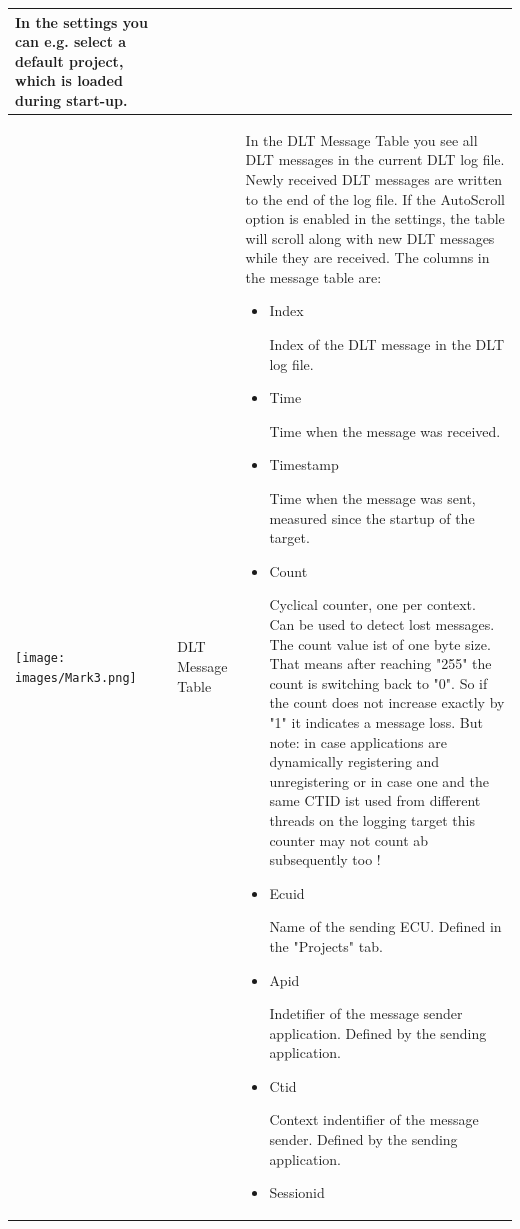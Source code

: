\documentclass[a4paper,11pt]{article}
\begin{document}
\begin{longtable}{| l | m{3cm}  | m{11cm} |}
   In the settings you can e.g. select a default project, which is loaded during start-up.  \\
   \hline
   \texttt{[image: images/Mark3.png]}
   &
    DLT Message Table
   &
   In the DLT Message Table you see all DLT messages in the current DLT log file.
   Newly received DLT messages are written to the end of the log file.
   If the AutoScroll option is enabled in the settings, the table will scroll along with new DLT messages while they are received.
   The columns in the message table are:\label{messagetablecolumns}
  \begin{itemize}
   \item \begin{bf}Index\end{bf}
    Index of the DLT message in the DLT log file.
   \item \begin{bf}Time\end{bf}
    Time when the message was received.
   \item \begin{bf}Timestamp\end{bf}
     Time when the message was sent, measured since the startup of the target.
   \item \begin{bf}Count\end{bf}
    Cyclical counter, one per context. Can be used to detect lost messages. The count value ist of one byte size. That means after 
    reaching "255" the count is switching back to "0". So if the count does not increase exactly by "1" it indicates a message loss.
    But note: in case applications are dynamically registering and unregistering or in case one and the same CTID ist used from
    different threads on the logging target this counter may not count ab subsequently too !
   \item \begin{bf}Ecuid\end{bf}
    Name of the sending ECU. Defined in the "Projects" tab.
   \item \begin{bf}Apid\end{bf}
    Indetifier of the message sender application. Defined by the sending application.
   \item \begin{bf}Ctid\end{bf}
    Context indentifier of the message sender. Defined by the sending application.
   \item \begin{bf}Sessionid\end{bf}

\end{itemize}
\end{longtable}
\end{document}

